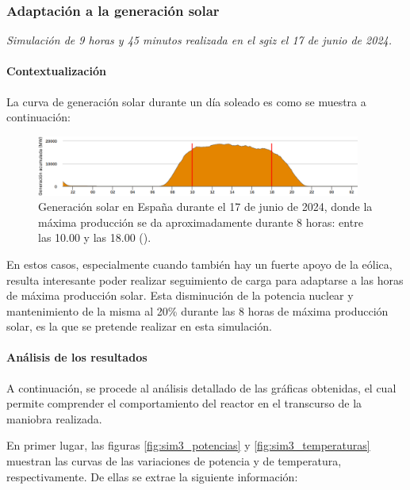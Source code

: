 \subsubsection{Adaptación a la generación solar}

\textit{Simulación de 9 horas y 45 minutos realizada en el \acrshort{sgiz} el 17 de junio de 2024.}

\paragraph{Contextualización}

La curva de generación solar durante un día soleado es como se muestra a continuación:

\begin{figure}[!h]
  \centering
  \includegraphics[width=0.95\textwidth]{content/figures/generacion_solar.png}
  \caption{Generación solar en España durante el 17 de junio de 2024, donde la máxima producción se da aproximadamente durante 8 horas: entre las 10.00 y las 18.00 (\cite{ree_demanda}).}
  \label{fig:generacion_solar}
\end{figure}

En estos casos, especialmente cuando también hay un fuerte apoyo de la eólica, resulta interesante poder realizar seguimiento de carga para adaptarse a las horas de máxima producción solar. Esta disminución de la potencia nuclear y mantenimiento de la misma al 20\% durante las 8 horas de máxima producción solar, es la que se pretende realizar en esta simulación.

\paragraph{Análisis de los resultados}

A continuación, se procede al análisis detallado de las gráficas obtenidas, el cual permite comprender el comportamiento del reactor en el transcurso de la maniobra realizada.

En primer lugar, las figuras \ref{fig:sim3_potencias} y \ref{fig:sim3_temperaturas} muestran las curvas de las variaciones de potencia y de temperatura, respectivamente. De ellas se extrae la siguiente información:


